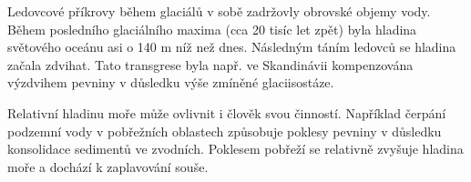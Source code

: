 Ledovcové příkrovy během glaciálů v sobě zadržovly obrovské objemy vody. Během posledního glaciálního maxima (cca 20 tisíc let zpět) byla hladina světového oceánu asi o 140 m níž než dnes. Následným táním ledovců se hladina začala zdvihat. Tato transgrese byla např. ve Skandinávii kompenzována výzdvihem pevniny v důsledku výše zmíněné glaciisostáze.

Relativní hladinu moře může ovlivnit i člověk svou činností. Například čerpání podzemní vody v pobřežních oblastech způsobuje poklesy pevniny v důsledku konsolidace sedimentů ve zvodních. Poklesem pobřeží se relativně zvyšuje hladina moře a dochází k zaplavování souše.


%












